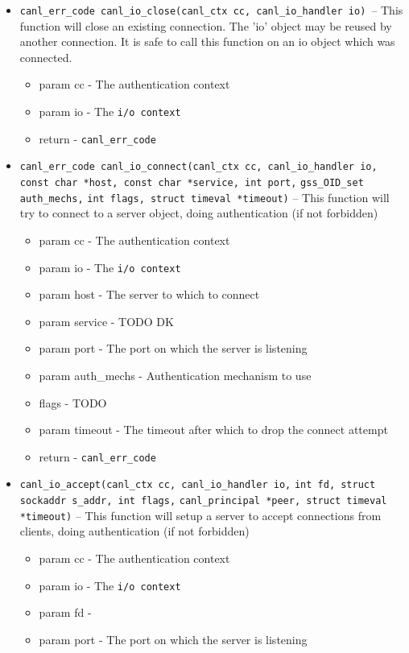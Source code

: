 \begin{itemize}
  \item \verb'canl_err_code canl_io_close(canl_ctx cc, canl_io_handler io)' --
  This function will close an existing connection.  The 'io' object may 
  be reused by another connection. It is safe to call this 
  function on an io object which was connected.
  \begin{itemize}
    \item param cc - The authentication context
    \item param io - The \verb'i/o context'
    \item return - \verb'canl_err_code'
  \end{itemize}
  \item \verb'canl_err_code canl_io_connect(canl_ctx cc, canl_io_handler io,' 
  \verb'const char *host, const char *service, int port,' 
  \verb'gss_OID_set auth_mechs,'
  \verb'int flags, struct timeval *timeout)' --
  This function will try to connect to a server object, 
  doing authentication (if not forbidden)
  \begin{itemize}
    \item param cc - The authentication context
    \item param io - The \verb'i/o context'
    \item param host - The server to which to connect
    \item param service - TODO DK
    \item param port - The port on which the server is listening
    \item param auth\_mechs - Authentication mechanism to use
    \item flags - TODO
    \item param timeout - The timeout after which to drop the connect attempt
    \item return - \verb'canl_err_code'
  \end{itemize}
  \item \verb'canl_io_accept(canl_ctx cc, canl_io_handler io,'
  \verb'int fd, struct sockaddr s_addr, int flags,'
  \verb'canl_principal *peer, struct timeval *timeout)' -- This function will 
  setup a server to accept connections from clients, doing 
  authentication (if not forbidden)
  \begin{itemize}
    \item param cc - The authentication context
    \item param io - The \verb'i/o context'
    \item param fd - \TODO
    \item param port - The port on which the server is listening
  \end{itemize}

\end{itemize}

